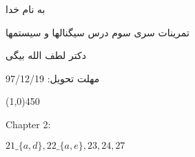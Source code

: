 \documentclass[50pt]{article}
\newcommand{\hl}{
\begin{center}
\line(1,0){450}
\end{center}}
\begin{document}
\setLTR 




\begin{RTL}
\Large{








\begin{center}
به نام خدا

تمرینات سری سوم درس سیگنالها و سیستمها

دکتر لطف الله بیگی

مهلت تحویل: 97/12/19
\end{center}

\hl
\begin{latin}
Chapter 2:

$21\_\{a,d\} , 22\_\{a,e\} , 23 , 24,27$
\end{latin}






}





\end{RTL}
\end{document}
